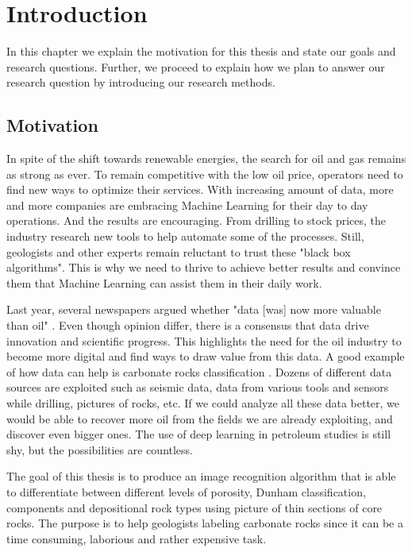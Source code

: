\chapter{Introduction}
\label{chp:introduction} 
In this chapter we explain the motivation for this thesis and state our goals and research questions. Further, we  proceed to explain how we plan to answer our research question by introducing our research methods.   
\section{Motivation}
In spite of the shift towards renewable energies, the search for oil and gas remains as strong as ever. To remain competitive with the low oil price, operators need to find new ways to optimize their services. 
With increasing amount of data,  more and more companies are embracing Machine Learning for their day to day operations. And the results are encouraging. 
From drilling to stock prices, the industry research  new tools to help automate some of the processes. 
Still, geologists and other experts remain reluctant to trust these "black box algorithms". This is why we need to thrive to achieve better results and convince them that Machine Learning can assist them in their daily work.

Last year, several newspapers argued whether "data [was] now more valuable than oil" \cite{economist,forbes}. Even though opinion differ, there is a consensus that data drive innovation and scientific progress. This highlights the need for the oil industry to become more digital and find ways to draw value from this data. A good example of how data can help is carbonate rocks classification \cite{carbo}. Dozens of different data sources are exploited such as seismic data, data from various tools and sensors while drilling, pictures of rocks, etc. If  we could analyze all these data better, we would be able to recover more oil from the fields we are already exploiting, and discover even bigger ones. The use of deep learning in petroleum studies is still shy, but the possibilities are countless.


The goal of this thesis is to produce an image recognition algorithm that is able to differentiate between different levels of porosity,  Dunham classification, components and depositional rock types using picture of thin sections of core rocks. The purpose is to help geologists labeling carbonate rocks since it can be a time consuming, laborious and rather expensive task. 

